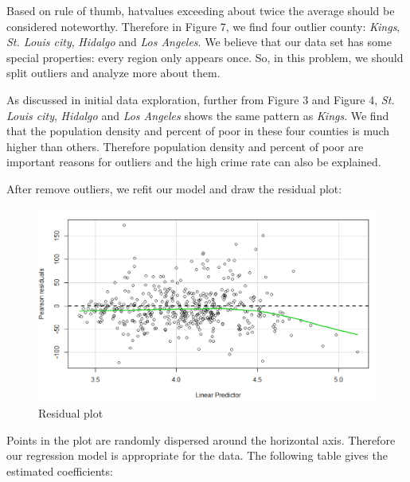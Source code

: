 \documentclass[oneside,11pt]{homework}
\begin{document}
Based on rule of thumb, hatvalues exceeding about twice the average should be considered noteworthy. Therefore in Figure 7, we find four outlier county: \textit{Kings}, \textit{St. Louis city}, \textit{Hidalgo} and \textit{Los Angeles}. We believe that our data set has some special properties: every region only appears once. So, in this problem, we should split outliers and analyze more about them.\par

As discussed in initial data exploration, further from Figure 3 and Figure 4, \textit{St. Louis city}, \textit{Hidalgo} and \textit{Los Angeles} shows the same pattern as \textit{Kings}. We find that the population density and percent of poor in these four counties is much higher than others. Therefore population density and percent of poor are important reasons for outliers and the high crime rate can also be explained.\par

After remove outliers, we refit our model and draw the residual plot:

\begin{figure}[H]
\centering
\includegraphics[scale=0.55]{residual.png}
\caption{Residual plot} 
\end{figure}

Points in the plot are randomly dispersed around the horizontal axis. Therefore our regression model is appropriate for the data. The following table gives the estimated coefficients:
\end{document}
